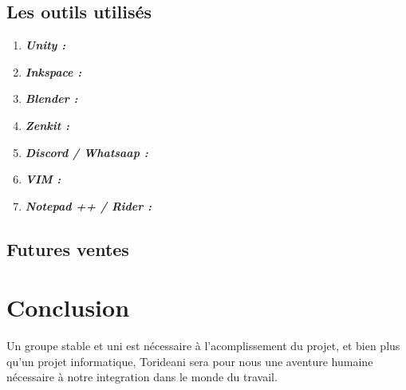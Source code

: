 \documentclass[12pt]{report}
\begin{document}
    \section{Les outils utilisés}
        \begin{enumerate}
            \item \textbf{\textit{Unity :}} \\
            \item \textbf{\textit{Inkspace :}} \\
            \item \textbf{\textit{Blender :}} \\
            \item \textbf{\textit{Zenkit :}} \\
            \item \textbf{\textit{Discord / Whatsaap :}} \\
            \item \textbf{\textit{VIM :}} \\
            \item \textbf{\textit{Notepad ++ / Rider :}} \\
        \end{enumerate}
    \section{Futures ventes}

\chapter{Conclusion}
Un groupe stable et uni est nécessaire à l'acomplissement du
projet, et bien plus qu'un projet informatique, Torideani sera pour
nous une aventure humaine nécessaire à notre integration dans le
monde du travail.
\end{document}
